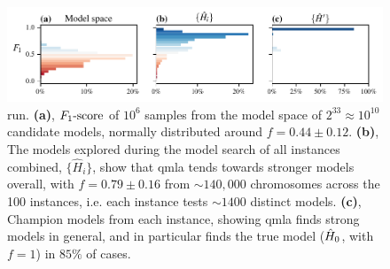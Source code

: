 \begin{figure}
    \begin{center}
        \includegraphics{experimental_study/figures/nv_ga_run_models_by_f.pdf}
    \end{center}
    \caption[  \gls{run}]{
          \gls{run}.
        \textbf{(a)}, 
            $ F_{1}\text{-score} $ of $10^6$ samples from the \gls{model space} of $2^{33}\approx10^{10}$ candidate models,
            normally distributed around $f=0.44 \pm 0.12$. 
        \textbf{(b)}, The models explored during the model search of all \glspl{instance} combined, 
            $\{\hat{H}_i\}$, show that \gls{qmla} tends towards stronger models overall, 
            with $f = 0.79 \pm 0.16$ from $\sim 140,000$ chromosomes across the 100 instances, 
            i.e. each \gls{instance} tests $\sim 1400$ distinct models. 
        \textbf{(c)}, Champion models from each instance, showing \gls{qmla} finds strong models 
            in general, and in particular finds the \gls{true model} ($\hat{H}_0$, with $f=1$) in $85\%$ of cases.
        }
    \label{fig:nv_ga_run_models}
\end{figure}

